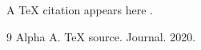 \documentclass{article}
\begin{document}
A TeX citation appears here \cite{alpha2020}.
\begin{thebibliography}{9}
 Alpha A. TeX source. Journal. 2020.
\end{thebibliography}
\end{document}
